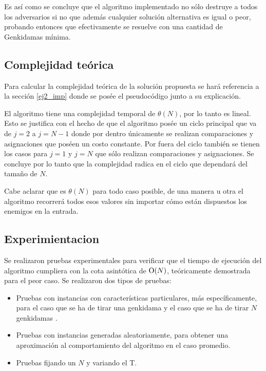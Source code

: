 	Es así como se concluye que el algoritmo implementado no sólo destruye a
	todos los adversarios si no que además cualquier solución alternativa es
	igual o peor, probando entonces que efectivamente se resuelve con una
	cantidad de Genkidamas mínima.

	\subsection{Complejidad teórica}

	Para calcular la complejidad teórica de la solución propuesta se hará
	referencia a la sección \ref{ej2_imp} donde se posée el pseudocódigo junto a
	su explicación.

	El algoritmo tiene una complejidad temporal de $\theta(N)$, por lo tanto es
	lineal. Esto se justifica con el hecho de que el algoritmo posée un ciclo
	principal que va de $j = 2$ a $j = N - 1$ donde por dentro únicamente se
	realizan comparaciones y asignaciones que poséen un costo constante. Por
	fuera del ciclo también se tienen los casos para $j = 1$ y $j = N$ que sólo
	realizan comparaciones y asignaciones. Se concluye por lo tanto que la
	complejidad radica en el ciclo que dependará del tamaño de $N$.

	Cabe aclarar que es $\theta(N)$ para todo caso posible, de una manera u otra
	el algoritmo recorrerá todos esos valores sin importar cómo están dispuestos
	los enemigos en la entrada.


    \subsection{Experimientacion}
         

	Se realizaron pruebas experimentales para verificar que el tiempo de ejecución del algoritmo cumpliera con la cota asintótica de $\operatorname{O}(N)$, teóricamente demostrada para el peor caso. Se realizaron dos tipos de pruebas:
        
        \begin{itemize}
            \item Pruebas con instancias con características particulares, más específicamente, para el caso que se ha de tirar una genkidama y el caso que se ha de tirar $N$ genkidamas .
            \item Pruebas con instancias generadas aleatoriamente, para obtener una aproximación al comportamiento del algoritmo en el caso promedio.
            \item Pruebas fijando un $N$ y variando el T. 
        \end{itemize}

